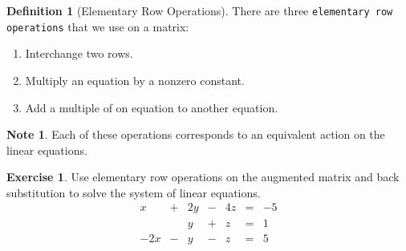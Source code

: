 \documentclass[handout]{beamer}
\theoremstyle{definition}
\newtheorem{exercise}{Exercise}
\newtheorem*{defn}{Definition}
\newtheorem*{nb}{Note}
\renewcommand{\emph}[1]{{\color{blue}\texttt{#1}}}
\begin{document}
\begin{frame}{\insertframenumber}
	\begin{defn}[Elementary Row Operations]
		There are three \emph{elementary row operations} that we use on a matrix:
			\begin{enumerate}[label=\textbf{\arabic*.}]
				\item Interchange two rows.
				\item Multiply an equation by a nonzero constant.
				\item Add a multiple of on equation to another equation.
			\end{enumerate}
	\end{defn}
	\begin{nb}
		Each of these operations corresponds to an equivalent action on the linear equations.
	\end{nb}
\end{frame}

\begin{frame}{\insertframenumber}
	\begin{exercise}
		Use elementary row operations on the augmented matrix and back substitution to solve the system of linear equations.
		\[\begin{array}{rcrcrcl}
		 	x&+&2y&-&4z&=&-5\\
		 	&&y&+&z&=&1\\
		 	-2x&-&y&-&z&=&5
		\end{array}\]
	\end{exercise}
\end{frame}
\end{document}
